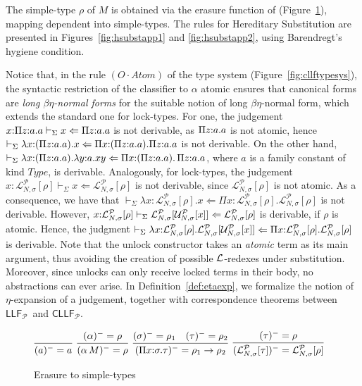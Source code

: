 \documentclass[submission,copyright,creativecommons]{eptcs}
\theoremstyle{plain}
\theoremstyle{definition}
\newcommand{\LLFP}  {\mbox{$\mathsf{LLF}_{\mathcal P}$}}
\newcommand{\CLLFP} {\mbox{$\mathsf{CLLF}_{\mathcal P}$}}
\newcommand {\at}   {\,}               \newcommand {\of}   {{:}}              \newcommand {\Type} {{\mathsf {type}}} \newcommand {\sig}  {{\mathsf {sig}}}  \newcommand {\ctx}  {{\mathsf {ctx}}}  \newcommand {\kind}  {{\mathsf {kind}}}
\newcommand {\Lock}   [4] {{\mathcal{L}}^{#1}_{#2, #3}[{#4}]} \newcommand {\LockC} [3] {{\mathcal{L}}^{#1}_{#2}      [{#3}]}
\newcommand {\VDASHS} {\vdash_\Sigma} \newcommand {\VDASHO} {\vdash_\Omega} \newcommand {\VDASHCBV} {\vdash_{\Sigma_{{CBV}}}} \newcommand {\VDASHSIMP} {\vdash_{\Sigma_{{Imp}}}} \newcommand {\VDASHSHOARE} {\vdash_{\Sigma_{{Hoare}}}} \newcommand {\VDASHSERASE} {\vdash_{\Sigma^\Erase}}    \newcommand {\VDASHEAL} {\vdash_{EAL}} \newcommand {\VDASHSEAL} {\vdash_{\Sigma_{{EAL}}}} \newcommand {\VDASHFP} {\vdash_{\sf FPST}}
\renewcommand {\P} {\mathcal{P}} \newcommand {\Q} {\mathcal{Q}}
\renewcommand {\L} {\mathcal{L}} \newcommand   {\C} {\mathcal{C}} \newcommand   {\T} {\mathcal{T}} \newcommand   {\U} {\mathcal{U}}
\newcommand{\up}[1]   {\vspace{-#1mm}}
\newcommand{\Erase} {{-\U\L}}
\begin{document}
The simple-type $\rho$ of $M$ is obtained via the erasure function of
\cite{HarperLicata-jfp-07} (Figure~\ref{fig:erasure}), mapping
dependent into simple-types. The rules for Hereditary Substitution are
presented in Figures~\ref{fig:hsubstapp1} and \ref{fig:hsubstapp2},
using Barendregt's hygiene condition.

Notice that, in the rule $(O{\cdot}Atom)$ of the type system
(Figure~\ref{fig:cllftypesys}), the syntactic restriction of the
classifier to $\alpha$ atomic ensures that canonical forms are
\emph{long $\beta\eta$-normal forms} for the suitable notion of long
$\beta\eta$-normal form, which extends the standard one for
lock-types. For one, the judgement
$x\of \Prod{z}{a}{a} \VDASHS x \Leftarrow \Prod{z}{a}{a}$ is not
derivable, as $ \Prod{z}{a}{a}$ is not atomic, hence
$\VDASHS \lambda x\of (\Prod{z}{a}{a}). x \Leftarrow
\Prod{x}{(\Prod{z}{a}{a})}{\Prod{z}{a}{a}}$
is not derivable. On the other hand,
$\VDASHS {\Abs{x}{(\Prod{z}{a}{a})}{{\Abs{y}{a}{xy}}}} \Leftarrow
\Prod{x}{(\Prod{z}{a}{a})}{\, \Prod{z}{a}{a}}$,
where $a$ is a family constant of kind $\mathit{Type}$, is
derivable. Analogously, for lock-types, the judgement
$x\of \Lock {\P} N {\sigma} {\rho} \VDASHS x \Leftarrow \Lock {\P} N
{\sigma} {\rho}$
is not derivable, since $\Lock {\P} N {\sigma} {\rho}$ is not atomic.
As a consequence, we have that
$\VDASHS \lambda x\of\Lock {\P} N {\sigma} {\rho}. x \Leftarrow \Pi
x\of \Lock {\P} N {\sigma} {\rho}. \Lock {\P} N {\sigma} {\rho}$
is not derivable. However,
$x\of \Lock {\P} N {\sigma} {\rho} \VDASHS \Lock {\P} N {\sigma} {
  \Unlock {\P} N {\sigma} {x} } \Leftarrow \Lock {\P} N {\sigma}
{\rho}$
is derivable, if $\rho$ is atomic. Hence, the judgment
$\VDASHS \lambda x\of \Lock {\P} N {\sigma} {\rho} . \Lock {\P} N
{\sigma} { \Unlock {\P} N {\sigma} {x} } \Leftarrow \Pi x \of \Lock
{\P} N {\sigma} {\rho}. \Lock {\P} N {\sigma} {\rho}$
is derivable.  Note that the unlock constructor takes an \emph{atomic}
term as its main argument, thus avoiding the creation of possible
${\cal L}$-redexes under substitution. Moreover, since unlocks can
only receive locked terms in their body, no abstractions can ever
arise.  In Definition~\ref{def:etaexp}, we formalize the notion of
$\eta$-expansion of a judgement, together with correspondence theorems
between \LLFP\ and \CLLFP.

\begin{figure}[t!]
{\small
 \up{2}
   $
     \infer[]
     {(a)^-=a}
     {}
\hfill
\infer[]
     {(\alpha \at M)^-=\rho}
     {(\alpha)^-=\rho}
\hfill
\infer[]
     {({\Prod x {\sigma} \tau})^-=\rho_1 \to\rho_2}
     {(\sigma)^-=\rho_1 & (\tau)^-=\rho_2}
\hfill
\infer[]
     {({\Lock {\P} N {\sigma} {\tau}})^-= \Lock {\P} N {\sigma} {\rho}}
     {(\tau)^-=\rho}
   $}
   \up{1}
   \caption{Erasure to simple-types} \up{1}
   \label{fig:erasure}
\end{figure}
\end{document}
